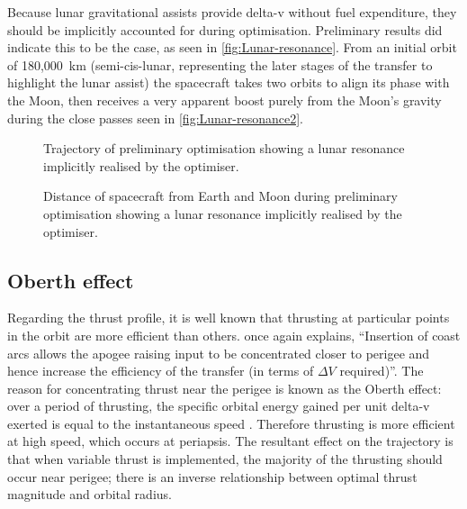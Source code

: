Because lunar gravitational assists provide delta-v without fuel expenditure, they should be implicitly accounted for during optimisation. Preliminary results did indicate this to be the case, as seen in \autoref{fig:Lunar-resonance}. From an initial orbit of 180,000~km (semi-cis-lunar, representing the later stages of the transfer to highlight the lunar assist) the spacecraft takes two orbits to align its phase with the Moon, then receives a very apparent boost purely from the Moon's gravity during the close passes seen in \autoref{fig:Lunar-resonance2}.

\begin{figure}
\caption{Trajectory of preliminary optimisation showing a lunar resonance implicitly realised by the optimiser.}
\label{fig:Lunar-resonance}
\centering
\def\svgwidth{\figurewidth}

\end{figure}

\begin{figure}
\caption{Distance of spacecraft from Earth and Moon during preliminary optimisation showing a lunar resonance implicitly realised by the optimiser.}
\label{fig:Lunar-resonance2}
\centering
\def\svgwidth{\figurewidth}

\end{figure}


 
\subsection{Oberth effect} \label{sub:Oberth}

Regarding the thrust profile, it is well known that thrusting at particular points in the orbit are more efficient than others. \textcite{Kemble2006} once again explains, \enquote{Insertion of coast arcs allows the apogee raising input to be concentrated closer to perigee and hence increase the efficiency of the transfer (in terms of $\Delta V$ required)}. The reason for concentrating thrust near the perigee is known as the Oberth effect: over a period of thrusting, the specific orbital energy gained per unit delta-v exerted is equal to the instantaneous speed \parencite{Oberth1923}. Therefore thrusting is more efficient at high speed, which occurs at periapsis. The resultant effect on the trajectory is that when variable thrust is implemented, the majority of the thrusting should occur near perigee; there is an inverse relationship between optimal thrust magnitude and orbital radius. 

